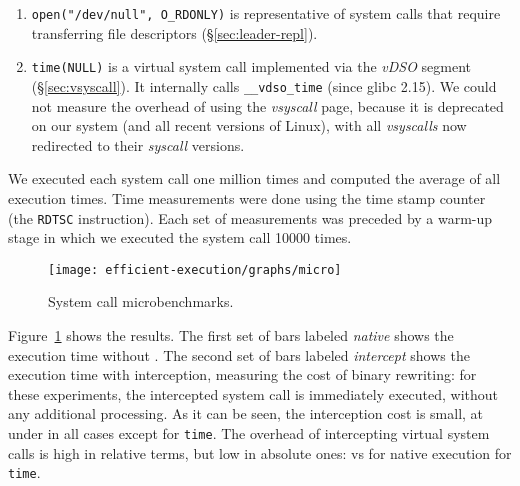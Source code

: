 \begin{enumerate}
\item \lstinline`open("/dev/null", O_RDONLY)` is representative of system calls that
  require transferring file descriptors (\S\ref{sec:leader-repl}).

\item \lstinline`time(NULL)` is a virtual system call implemented via the
  \textit{vDSO} segment (\S\ref{sec:vsyscall}). It internally calls
  \lstinline`__vdso_time` (since glibc 2.15).  We could not measure
  the overhead of using the \textit{vsyscall} page, because it is
  deprecated on our system (and all recent versions of Linux), with
  all \textit{vsyscalls} now redirected to their \textit{syscall}
  versions.

\end{enumerate}


We executed each system call one million times and computed the average
of all execution times.  Time measurements were done using the time
stamp counter (\ie the \lstinline`RDTSC` instruction). Each set of
measurements was preceded by a warm-up stage in which we executed the
system call \num{10000} times. %

\begin{figure}[!t]
  \centering
  \texttt{[image: efficient-execution/graphs/micro]}
  \caption{System call microbenchmarks.}
  \label{fig:micro_syscall}
\end{figure}


Figure~\ref{fig:micro_syscall} shows the results.  The first set of
bars labeled \textit{native} shows the execution time without \varan.
The second set of bars labeled \textit{intercept} shows the execution
time with interception, measuring the cost of binary rewriting: for
these experiments, the intercepted system call is immediately
executed, without any additional processing.  As it can be seen, the
interception cost is small, at under \maxInterceptOvh in all
cases except for \lstinline`time`. The overhead of intercepting virtual system calls is high
in relative terms, but low in absolute ones: \vdsoIntercept vs
\vdsoNative for native execution for \lstinline`time`.


